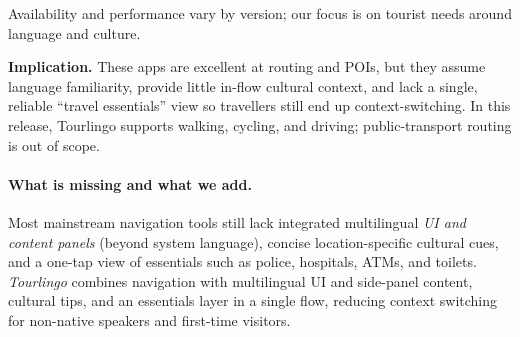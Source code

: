 \begin{sloppypar}
\begin{table}[H]
  \vspace{3pt}
  \begin{flushleft}
\small Availability and performance vary by version; our focus is on tourist needs around language and culture.
  \end{flushleft}
\end{table}

\noindent\textbf{Implication.}
These apps are excellent at routing and POIs, but they assume language familiarity, provide little in-flow cultural context, and lack a single, reliable “travel essentials” view so travellers still end up context-switching. In this release, Tourlingo supports walking, cycling, and driving; public-transport routing is out of scope.

\paragraph{What is missing and what we add.}
Most mainstream navigation tools still lack integrated multilingual \emph{UI and content panels} (beyond system language), concise location-specific cultural cues, and a one-tap view of essentials such as police, hospitals, ATMs, and toilets. \emph{Tourlingo} combines navigation with multilingual UI and side-panel content, cultural tips, and an essentials layer in a single flow, reducing context switching for non-native speakers and first-time visitors.

\end{sloppypar}
